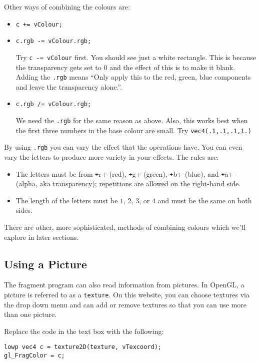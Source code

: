 \documentclass[
  html5,%
  mathml,%
  use filename%
]{internet}
\begin{document}
Other ways of combining the colours are:
%
\begin{itemize}
\item \verb!c += vColour;!
\item \verb!c.rgb -= vColour.rgb;!

Try \verb!c -= vColour! first.
You should see just a white rectangle.
This is because the transparency gets set to \(0\) and the effect of this is to make it blank.
Adding the \verb+.rgb+ means ``Only apply this to the red, green, blue components and leave the transparency alone.''.

\item \verb!c.rgb /= vColour.rgb;!

We need the \verb!.rgb! for the same reason as above.
Also, this works best when the first three numbers in the base colour are small.
Try \verb!vec4(.1,.1,.1,1.)!
\end{itemize}

By using \verb!.rgb! you can vary the effect that the operations have.
You can even vary the letters to produce more variety in your effects.
The rules are:
%
\begin{itemize}
\item The letters must be from \texttt+r+ (red), \texttt+g+ (green), \texttt+b+ (blue), and \texttt+a+ (alpha, aka transparency); repetitions are allowed on the right-hand side.
\item The length of the letters must be \(1\), \(2\), \(3\), or \(4\) and must be the same on both sides.
\end{itemize}

There are other, more sophisticated, methods of combining colours which we'll explore in later sections.

\subsection{Using a Picture}

The fragment program can also read information from pictures.
In OpenGL, a picture is referred to as a \verb+texture+.
On this website, you can choose textures via the drop down menu and can add or remove textures so that you can use more than one picture.

Replace the code in the text box with the following:

\begin{tcolorbox}
\begin{verbatim}
lowp vec4 c = texture2D(texture, vTexcoord);
gl_FragColor = c;
\end{verbatim}
\end{tcolorbox}
\end{document}
